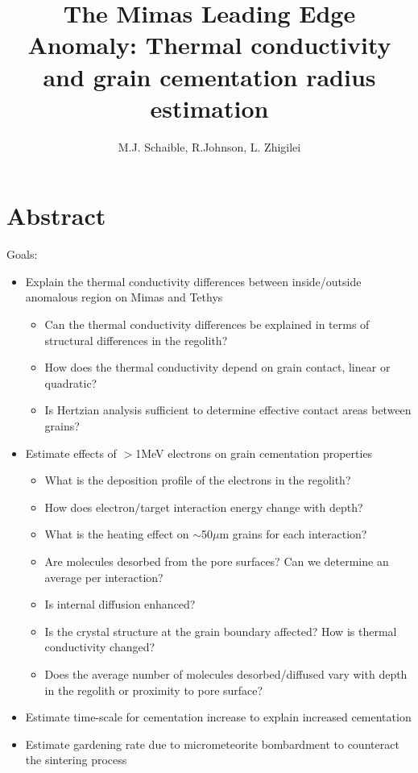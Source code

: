 \documentclass[11pt]{article} %
\title{The Mimas Leading Edge Anomaly: Thermal conductivity and grain cementation radius estimation}
\author{M.J. Schaible, R.Johnson, L. Zhigilei}
\begin{document}
\maketitle

\section{Abstract}

	Goals:
	\begin{itemize}
	\item Explain the thermal conductivity differences between inside/outside anomalous region on Mimas and Tethys
		\begin{itemize}
		\item Can the thermal conductivity differences be explained in terms of structural differences in the regolith?
		\item How does the thermal conductivity depend on grain contact, linear or quadratic?
		\item Is Hertzian analysis sufficient to determine effective contact areas between grains?
		\end{itemize}
	\item Estimate effects of $>$1MeV electrons on grain cementation properties
		\begin{itemize}
		\item What is the deposition profile of the electrons in the regolith?
		\item How does electron/target interaction energy change with depth?
		\item What is the heating effect on $\sim$50$\mu$m grains for each interaction?
		\item Are molecules desorbed from the pore surfaces? Can we determine an average per interaction?
		\item Is internal diffusion enhanced?
		\item Is the crystal structure at the grain boundary affected? How is thermal conductivity changed?
		\item Does the average number of molecules desorbed/diffused vary with depth in the regolith or proximity to pore surface?
		\end{itemize}
	\item Estimate time-scale for cementation increase to explain increased cementation
	\item Estimate gardening rate due to micrometeorite bombardment to counteract the sintering process
	\end{itemize}
\end{document}
